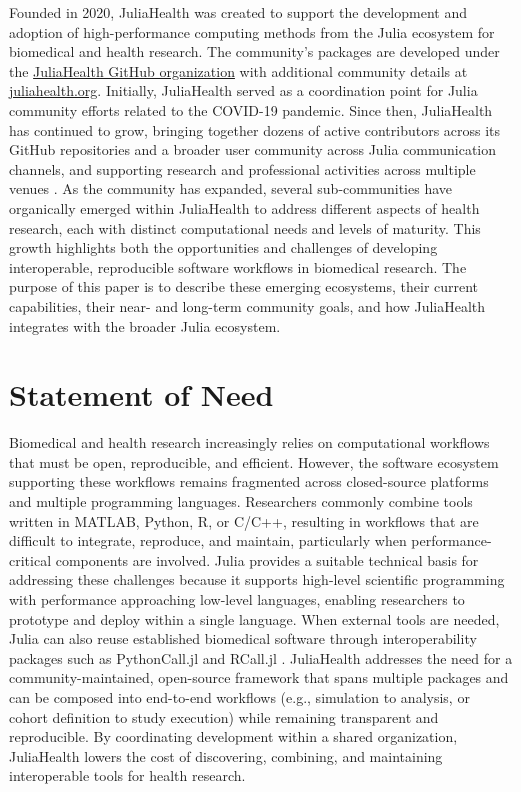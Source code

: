 \documentclass{juliacon}
\begin{document}
Founded in 2020, JuliaHealth was created to support the development and adoption of high-performance computing methods from the Julia ecosystem for biomedical and health research.
The community's packages are developed under the \href{https://github.com/JuliaHealth}{JuliaHealth GitHub organization} with additional community details at \href{https://juliahealth.org}{juliahealth.org}.
Initially, JuliaHealth served as a coordination point for Julia community efforts related to the COVID-19 pandemic.
Since then, JuliaHealth has continued to grow, bringing together dozens of active contributors across its GitHub repositories and a broader user community across Julia communication channels, and supporting research and professional activities across multiple venues \cite{zelko2025juliahealth, Zelko2023Julia}.
As the community has expanded, several sub-communities have organically emerged within JuliaHealth to address different aspects of health research, each with distinct computational needs and levels of maturity.
This growth highlights both the opportunities and challenges of developing interoperable, reproducible software workflows in biomedical research.
The purpose of this paper is to describe these emerging ecosystems, their current capabilities, their near- and long-term community goals, and how JuliaHealth integrates with the broader Julia ecosystem.


\section{Statement of Need}

Biomedical and health research increasingly relies on computational workflows that must be open, reproducible, and efficient.
However, the software ecosystem supporting these workflows remains fragmented across closed-source platforms and multiple programming languages.
Researchers commonly combine tools written in MATLAB, Python, R, or C/C++, resulting in workflows that are difficult to integrate, reproduce, and maintain, particularly when performance-critical components are involved. 
Julia provides a suitable technical basis for addressing these challenges because it supports high-level scientific programming with performance approaching low-level languages, enabling researchers to prototype and deploy within a single language.
When external tools are needed, Julia can also reuse established biomedical software through interoperability packages such as PythonCall.jl \cite{PythonCall.jl} and RCall.jl \cite{randy_lai_2026_18422923}.
JuliaHealth addresses the need for a community-maintained, open-source framework that spans multiple packages and can be composed into end-to-end workflows (e.g., simulation to analysis, or cohort definition to study execution) while remaining transparent and reproducible.
By coordinating development within a shared organization, JuliaHealth lowers the cost of discovering, combining, and maintaining interoperable tools for health research.
\end{document}

